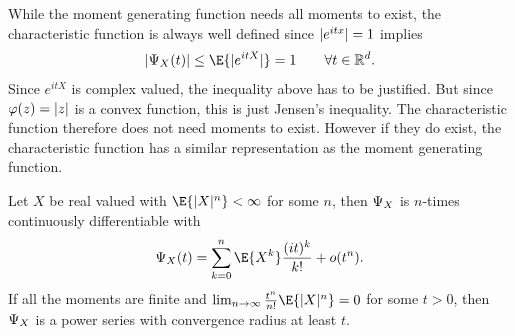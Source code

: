 While the moment generating function needs all moments to exist, the
characteristic function is always well defined since \(\lvert e^{itx}\rvert =1\)
implies
\begin{equation}
    \label{eq: bound on characteristic function}    
    \abs{\charFct_X(t)} \le \E{\abs{e^{itX}}} = 1
    \qquad \forall t\in \real^\dims.
\end{equation}
Since \(e^{itX}\) is complex valued, the inequality above has to be justified.
But since \(\varphi(z) = \lvert z\rvert\) is a convex function, this is just Jensen's
inequality. The characteristic function therefore does not need moments to
exist. However if they do exist, the characteristic function has a similar
representation as the moment generating function.

\begin{lemma}
    \label{lem: characteristic function representation}
    Let \(X\) be real valued with \(\E{\abs{X}^n} < \infty\) for some
    \(n\), then \(\Psi_X\) is \(n\)-times continuously differentiable
    with
    \begin{equation}
        \label{eq: taylor expansion characteristic function}    
        \charFct_X(t) = \sum_{k=0}^n \E{X^k}\frac{(it)^k}{k!} + o(t^n).
    \end{equation}
    If all the moments are finite and \(\lim_{n\to \infty}
    \frac{t^n}{n!}\E{\abs{X}^n} =0\) for some \(t>0\), then
    \(\Psi_X\) is a power series with convergence radius at least \(t\).
\end{lemma}

